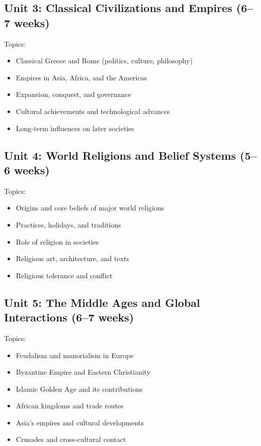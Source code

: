 \documentclass[11pt,letterpaper]{report}
\begin{document}
\subsection{Unit 3: Classical Civilizations and Empires (6–7 weeks)}

Topics:
\begin{itemize}
\item Classical Greece and Rome (politics, culture, philosophy)
\item Empires in Asia, Africa, and the Americas
\item Expansion, conquest, and governance
\item Cultural achievements and technological advances
\item Long-term influences on later societies
\end{itemize}

\subsection{Unit 4: World Religions and Belief Systems (5–6 weeks)}

Topics:
\begin{itemize}
\item Origins and core beliefs of major world religions
\item Practices, holidays, and traditions
\item Role of religion in societies
\item Religious art, architecture, and texts
\item Religious tolerance and conflict
\end{itemize}

\subsection{Unit 5: The Middle Ages and Global Interactions (6–7 weeks)}

Topics:
\begin{itemize}
\item Feudalism and manorialism in Europe
\item Byzantine Empire and Eastern Christianity
\item Islamic Golden Age and its contributions
\item African kingdoms and trade routes
\item Asia’s empires and cultural developments
\item Crusades and cross-cultural contact
\end{itemize}
\end{document}

